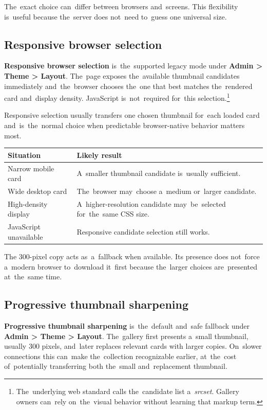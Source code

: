 \documentclass[11pt,a4paper]{article}
\newcommand{\ui}[1]{\textbf{#1}}
\begin{document}
The~exact choice can~differ between browsers and~screens. This flexibility
is~useful because the~server does not~need to~guess one universal size.

\subsection{Responsive browser selection}

\ui{Responsive browser selection} is~the~supported legacy mode under \ui{Admin >
Theme > Layout}. The~page exposes the~available thumbnail candidates immediately
and~the~browser chooses the~one that best matches the~rendered card and~display
density. JavaScript is~not~required for~this selection.\footnote{The~underlying
web standard calls the~candidate list a~\emph{srcset}. Gallery owners can~rely
on~the~visual behavior without learning that markup term.}

Responsive selection usually transfers one chosen thumbnail for~each loaded card
and~is~the~normal choice when predictable browser-native behavior matters most.

\begin{tabularx}{\textwidth}{>{\raggedright\arraybackslash}p{} X}
\toprule
\textbf{Situation} & \textbf{Likely result}\\
\midrule
Narrow mobile card & A~smaller thumbnail candidate is~usually sufficient.\\
Wide desktop card & The~browser may~choose a~medium or~larger candidate.\\
High-density display & A~higher-resolution candidate may~be~selected
for~the~same CSS size.\\
JavaScript unavailable & Responsive candidate selection still works.\\
\bottomrule
\end{tabularx}

The 300-pixel copy acts as~a~fallback when available. Its presence does
not~force a~modern browser to~download it~first because the~larger choices
are~presented at~the~same time.

\subsection{Progressive thumbnail sharpening}

\ui{Progressive thumbnail sharpening} is~the~default and~safe fallback under
\ui{Admin > Theme > Layout}. The~gallery first presents a~small thumbnail,
usually 300 pixels, and~later replaces relevant cards with larger copies.
On~slower connections this can~make the~collection recognizable earlier,
at~the~cost of~potentially transferring both the~small and~replacement
thumbnail.
\end{document}
